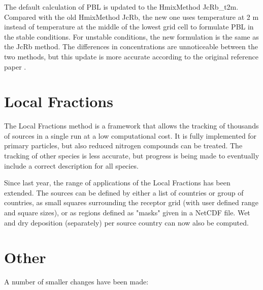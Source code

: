 The default calculation of PBL is updated to the HmixMethod JcRb\_t2m. Compared with the old HmixMethod JcRb, the new one uses temperature at 2 m instead of temperature at the middle of the lowest grid cell to formulate PBL in the stable conditions. For unstable conditions, the new formulation is the same as the JcRb method. The differences in concentrations are unnoticeable between the two methods, but this update is more accurate according to the original reference paper \citep{JcRb}.  


\section{Local Fractions}
\label{sec:updateLF}

The Local Fractions method \citep{wind-2020} is a framework that allows the tracking of thousands of sources in a single run at a low computational cost. It is fully implemented for primary particles, but also reduced nitrogen compounds can be treated. The tracking of other species is less accurate, but progress is being made to eventually include a correct description for all species.

Since last year, the range of applications of the Local Fractions has been extended.
The sources can be defined by either a list of countries or group of countries, as small squares surrounding the receptor grid (with user defined range and square sizes), or as regions defined as "masks" given in a NetCDF file.
Wet and dry deposition (separately) per source country can now also be computed.

\section{Other}
\label{sec:updateOther}

A number of smaller changes have been made:

